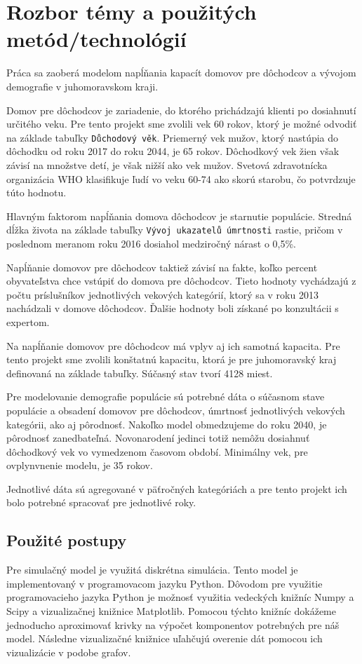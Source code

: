 \documentclass[a4paper, 11pt]{article}
\begin{document}
\section{Rozbor témy a použitých metód/technológií}
Práca sa zaoberá modelom napĺňania kapacít domovov pre dôchodcov a vývojom demografie v juhomoravskom kraji. 

Domov pre dôchodcov je zariadenie, do ktorého prichádzajú klienti po dosiahnutí určitého veku. Pre tento projekt sme zvolili vek 60 rokov, ktorý je možné odvodiť na základe tabuľky \texttt{Důchodový věk}\cite{duchod}. Priemerný vek mužov, ktorý nastúpia do dôchodku od roku 2017 do roku 2044, je 65 rokov. Dôchodkový vek žien však závisí na množstve detí, je však nižší ako vek mužov. Svetová zdravotnícka organizácia WHO klasifikuje ľudí vo veku 60-74 ako skorú starobu\cite{pac}, čo potvrdzuje túto hodnotu.

Hlavným faktorom napĺňania domova dôchodcov je starnutie populácie. Stredná dĺžka života na základe tabuľky \texttt{Vývoj ukazatelů úmrtnosti} \cite[str. 8]{zomreli} rastie, pričom v poslednom meranom roku 2016 dosiahol medziročný nárast o 0,5\%.

Napĺňanie domovov pre dôchodcov taktiež závisí na fakte, koľko percent obyvateľstva chce vstúpiť do domova pre dôchodcov. Tieto hodnoty vychádzajú z počtu príslušníkov jednotlivých vekových kategórií, ktorý sa v roku 2013 nachádzali v domove dôchodcov\cite{domovy}. Ďalšie hodnoty boli získané po konzultácii s expertom.

Na napĺňanie domovov pre dôchodcov má vplyv aj ich samotná kapacita. Pre tento projekt sme zvolili konštatnú kapacitu, ktorá je pre juhomoravský kraj definovaná na základe tabuľky\cite{miesta}. Súčasný stav tvorí 4128 miest.  

Pre modelovanie demografie populácie sú potrebné dáta o súčasnom stave populácie\cite{demografia} a obsadení domovov pre dôchodcov\cite{domovy}, úmrtnosť jednotlivých vekových kategórii\cite{zomreli}, ako aj pôrodnosť. Nakoľko model obmedzujeme do roku 2040, je pôrodnosť zanedbateľná. Novonarodení jedinci totiž nemôžu dosiahnuť dôchodkový vek vo vymedzenom časovom období. Minimálny vek, pre ovplynvnenie modelu, je 35 rokov.

Jednotlivé dáta sú agregované v päťročných kategóriách a pre tento projekt ich bolo potrebné spracovať pre jednotlivé roky.

\subsection{Použité postupy}
Pre simulačný model\cite[str. 44]{IMS} je využitá diskrétna simulácia\cite[str. 34]{IMS}. Tento model je implementovaný v programovacom jazyku Python. Dôvodom pre využitie programovacieho jazyka Python je možnosť využitia vedeckých knižníc Numpy a Scipy a vizualizačnej knižnice Matplotlib. Pomocou týchto knižníc dokážeme jednoducho aproximovať krivky na výpočet komponentov potrebných pre náš model. Následne vizualizačné knižnice uľahčujú overenie dát pomocou ich vizualizácie v podobe grafov.
\end{document}
